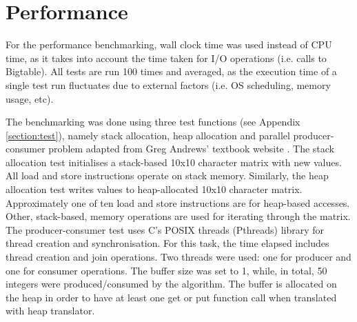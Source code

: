 \documentclass[bsc,frontabs,twoside,singlespacing,parskip,deptreport]{infthesis}     %
\begin{document}
\section{Performance}

For the performance benchmarking, wall clock time was used instead of CPU time, as it takes into account the time taken for I/O operations (i.e. calls to Bigtable). All tests are run 100 times and averaged, as the execution time of a single test run fluctuates due to external factors (i.e. OS scheduling, memory usage, etc).

The benchmarking was done using three test functions (see Appendix \ref{section:test}), namely stack allocation, heap allocation and parallel producer-consumer problem adapted from Greg Andrews' textbook website \citep{producer-consumer}. The stack allocation test initialises a stack-based 10x10 character matrix with new values. All load and store instructions operate on stack memory. Similarly, the heap allocation test writes values to heap-allocated 10x10 character matrix. Approximately one of ten load and store instructions are for heap-based accesses. Other, stack-based, memory operations are used for iterating through the matrix. The producer-consumer test uses C's POSIX threads (Pthreads) library for thread creation and synchronisation. For this task, the time elapsed includes thread creation and join operations. Two threads were used: one for producer and one for consumer operations. The buffer size was set to 1, while, in total, 50 integers were produced/consumed by the algorithm. The buffer is allocated on the heap in order to have at least one get or put function call when translated with heap translator.
\end{document}
